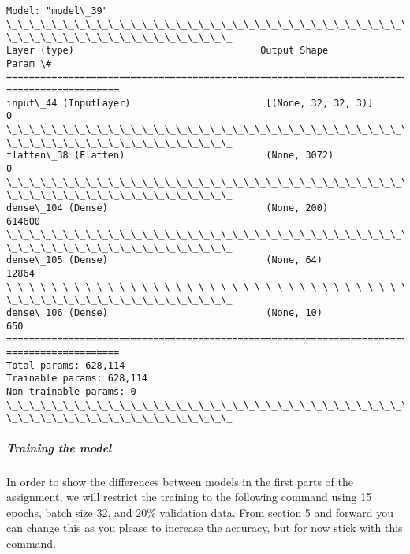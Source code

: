 \documentclass[11pt]{article}
\begin{document}
    \begin{Verbatim}[commandchars=\\\{\}]
Model: "model\_39"
\_\_\_\_\_\_\_\_\_\_\_\_\_\_\_\_\_\_\_\_\_\_\_\_\_\_\_\_\_\_\_\_\_\_\_\_\_\_\_\_\_\_\_\_\_\_\_\_\_\_\_\_\_\_\_\_\_\_\_\_\_\_\_\_\_\_\_\_\_\_\_\_\_\_\_\_\_\_\_\_
\_\_\_\_\_\_\_\_\_\_\_\_\_\_\_\_\_\_\_\_
Layer (type)                                 Output Shape
Param \#
================================================================================
====================
input\_44 (InputLayer)                        [(None, 32, 32, 3)]
0
\_\_\_\_\_\_\_\_\_\_\_\_\_\_\_\_\_\_\_\_\_\_\_\_\_\_\_\_\_\_\_\_\_\_\_\_\_\_\_\_\_\_\_\_\_\_\_\_\_\_\_\_\_\_\_\_\_\_\_\_\_\_\_\_\_\_\_\_\_\_\_\_\_\_\_\_\_\_\_\_
\_\_\_\_\_\_\_\_\_\_\_\_\_\_\_\_\_\_\_\_
flatten\_38 (Flatten)                         (None, 3072)
0
\_\_\_\_\_\_\_\_\_\_\_\_\_\_\_\_\_\_\_\_\_\_\_\_\_\_\_\_\_\_\_\_\_\_\_\_\_\_\_\_\_\_\_\_\_\_\_\_\_\_\_\_\_\_\_\_\_\_\_\_\_\_\_\_\_\_\_\_\_\_\_\_\_\_\_\_\_\_\_\_
\_\_\_\_\_\_\_\_\_\_\_\_\_\_\_\_\_\_\_\_
dense\_104 (Dense)                            (None, 200)
614600
\_\_\_\_\_\_\_\_\_\_\_\_\_\_\_\_\_\_\_\_\_\_\_\_\_\_\_\_\_\_\_\_\_\_\_\_\_\_\_\_\_\_\_\_\_\_\_\_\_\_\_\_\_\_\_\_\_\_\_\_\_\_\_\_\_\_\_\_\_\_\_\_\_\_\_\_\_\_\_\_
\_\_\_\_\_\_\_\_\_\_\_\_\_\_\_\_\_\_\_\_
dense\_105 (Dense)                            (None, 64)
12864
\_\_\_\_\_\_\_\_\_\_\_\_\_\_\_\_\_\_\_\_\_\_\_\_\_\_\_\_\_\_\_\_\_\_\_\_\_\_\_\_\_\_\_\_\_\_\_\_\_\_\_\_\_\_\_\_\_\_\_\_\_\_\_\_\_\_\_\_\_\_\_\_\_\_\_\_\_\_\_\_
\_\_\_\_\_\_\_\_\_\_\_\_\_\_\_\_\_\_\_\_
dense\_106 (Dense)                            (None, 10)
650
================================================================================
====================
Total params: 628,114
Trainable params: 628,114
Non-trainable params: 0
\_\_\_\_\_\_\_\_\_\_\_\_\_\_\_\_\_\_\_\_\_\_\_\_\_\_\_\_\_\_\_\_\_\_\_\_\_\_\_\_\_\_\_\_\_\_\_\_\_\_\_\_\_\_\_\_\_\_\_\_\_\_\_\_\_\_\_\_\_\_\_\_\_\_\_\_\_\_\_\_
\_\_\_\_\_\_\_\_\_\_\_\_\_\_\_\_\_\_\_\_
    \end{Verbatim}

    \hypertarget{training-the-model}{%
\subparagraph{\texorpdfstring{\textbf{Training the
model}}{Training the model}}\label{training-the-model}}

In order to show the differences between models in the first parts of
the assignment, we will restrict the training to the following command
using 15 epochs, batch size 32, and 20\% validation data. From section 5
and forward you can change this as you please to increase the accuracy,
but for now stick with this command.
\end{document}
